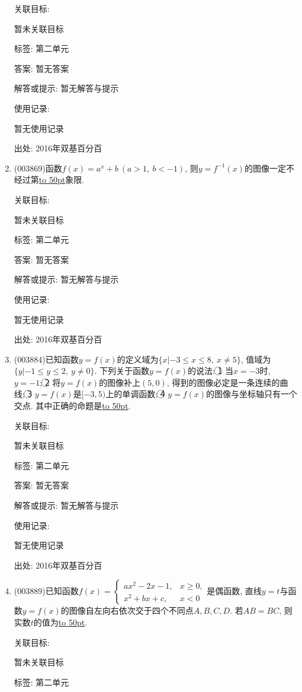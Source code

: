 \documentclass[10pt,a4paper]{article}
\newcommand{\blank}[1]{\underline{\hbox to #1pt{}}}
\begin{document}
\begin{enumerate}[1.]
关联目标:

暂未关联目标



标签: 第二单元

答案: 暂无答案

解答或提示: 暂无解答与提示

使用记录:

暂无使用记录


出处: 2016年双基百分百
\item { (003869)}函数$f(x)=a^x+b \ (a>1, \ b<-1)$, 则$y=f^{-1}(x)$的图像一定不经过第\blank{50}象限.


关联目标:

暂未关联目标



标签: 第二单元

答案: 暂无答案

解答或提示: 暂无解答与提示

使用记录:

暂无使用记录


出处: 2016年双基百分百
\item { (003884)}已知函数$y=f(x)$的定义域为$\{x|-3\le x\le 8, \ x\ne 5\}$, 值域为$\{y|-1\le y\le 2, \ y\ne 0\}$. 下列关于函数$y=f(x)$的说法: \textcircled{1} 当$x=-3$时, $y=-1$; \textcircled{2} 将$y=f(x)$的图像补上$(5,0)$, 得到的图像必定是一条连续的曲线; \textcircled{3} $y=f(x)$是$[-3,5)$上的单调函数; \textcircled{4} $y=f(x)$的图像与坐标轴只有一个交点. 其中正确的命题是\blank{50}.


关联目标:

暂未关联目标



标签: 第二单元

答案: 暂无答案

解答或提示: 暂无解答与提示

使用记录:

暂无使用记录


出处: 2016年双基百分百
\item { (003889)}已知函数$f(x)=\begin{cases}ax^2-2x-1, & x\ge 0,\\ x^2+bx+c, & x<0\end{cases}$是偶函数, 直线$y=t$与函数$y=f(x)$的图像自左向右依次交于四个不同点$A,B,C,D$. 若$AB=BC$, 则实数$t$的值为\blank{50}.


关联目标:

暂未关联目标



标签: 第二单元


\end{enumerate}
\end{document}
